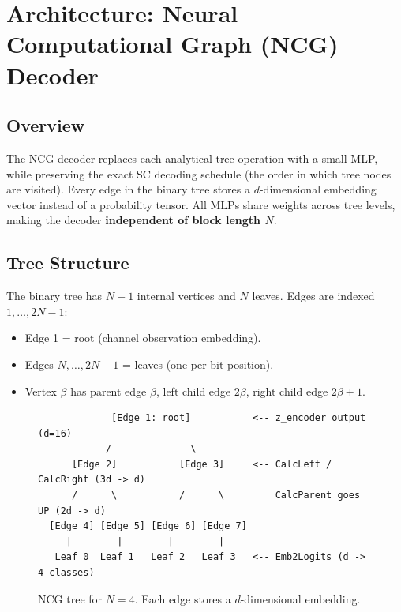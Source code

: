 \documentclass[10pt]{article}
\begin{document}
\section{Architecture: Neural Computational Graph (NCG) Decoder}

\subsection{Overview}

The NCG decoder replaces each analytical tree operation with a small MLP, while preserving the exact SC decoding schedule (the order in which tree nodes are visited). Every edge in the binary tree stores a $d$-dimensional embedding vector instead of a probability tensor. All MLPs share weights across tree levels, making the decoder \textbf{independent of block length $N$}.

\subsection{Tree Structure}

The binary tree has $N - 1$ internal vertices and $N$ leaves. Edges are indexed $1, \ldots, 2N-1$:
\begin{itemize}[nosep]
    \item Edge 1 = root (channel observation embedding).
    \item Edges $N, \ldots, 2N-1$ = leaves (one per bit position).
    \item Vertex $\beta$ has parent edge $\beta$, left child edge $2\beta$, right child edge $2\beta + 1$.
\end{itemize}

\begin{figure}[H]
\centering
\begin{small}
\begin{verbatim}
             [Edge 1: root]           <-- z_encoder output (d=16)
            /              \
      [Edge 2]           [Edge 3]     <-- CalcLeft / CalcRight (3d -> d)
      /      \           /      \         CalcParent goes UP (2d -> d)
  [Edge 4] [Edge 5] [Edge 6] [Edge 7]
     |        |        |        |
   Leaf 0  Leaf 1   Leaf 2   Leaf 3   <-- Emb2Logits (d -> 4 classes)
\end{verbatim}
\end{small}
\vspace{-6pt}
\caption{NCG tree for $N = 4$. Each edge stores a $d$-dimensional embedding.}
\label{fig:tree}
\end{figure}
\end{document}
